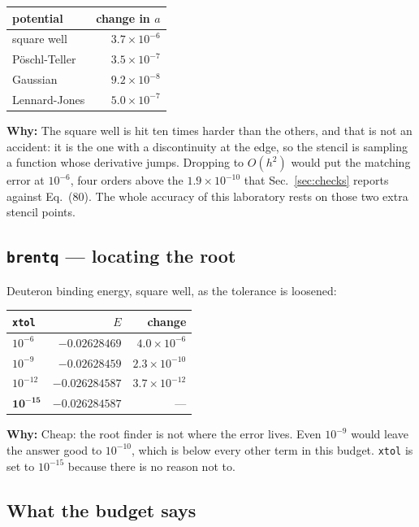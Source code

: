 \documentclass[11pt,a4paper]{article}
\newcommand{\why}[1]{\medskip\noindent\textbf{Why:} #1\medskip}
\begin{document}
\begin{center}\small
\begin{tabular}{lr}
\toprule
potential & change in $a$ \\
\midrule
square well & $3.7\times10^{-6}$ \\
Pöschl-Teller & $3.5\times10^{-7}$ \\
Gaussian & $9.2\times10^{-8}$ \\
Lennard-Jones & $5.0\times10^{-7}$ \\
\bottomrule
\end{tabular}
\end{center}

\why{The square well is hit ten times harder than the others, and that is not
an accident: it is the one with a discontinuity at the edge, so the stencil is
sampling a function whose derivative jumps. Dropping to $O(h^2)$ would put the
matching error at $10^{-6}$, four orders above the $1.9\times10^{-10}$ that
Sec.~\ref{sec:checks} reports against Eq.~(80). The whole accuracy of this
laboratory rests on those two extra stencil points.}

\subsection*{\texttt{brentq} --- locating the root}

Deuteron binding energy, square well, as the tolerance is loosened:

\begin{center}\small
\begin{tabular}{lrr}
\toprule
\texttt{xtol} & $E$ & change \\
\midrule
$10^{-6}$ & $-0.02628469$ & $4.0\times10^{-6}$ \\
$10^{-9}$ & $-0.02628459$ & $2.3\times10^{-10}$ \\
$10^{-12}$ & $-0.026284587$ & $3.7\times10^{-12}$ \\
$\mathbf{10^{-15}}$ & $-0.026284587$ & --- \\
\bottomrule
\end{tabular}
\end{center}

\why{Cheap: the root finder is not where the error lives. Even $10^{-9}$ would
leave the answer good to $10^{-10}$, which is below every other term in this
budget. \texttt{xtol} is set to $10^{-15}$ because there is no reason not to.}

\subsection*{What the budget says}
\end{document}
